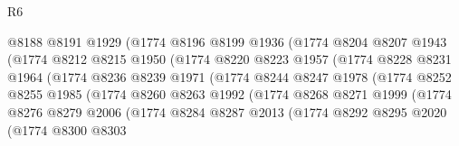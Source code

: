 \begin{lexlean}{R6}
\begin{coremodule}
                          @8188
                          @8191
                          @1929
                          (@1774
                            @8196
                            @8199
                            @1936
                            (@1774
                              @8204
                              @8207
                              @1943
                              (@1774
                                @8212
                                @8215
                                @1950
                                (@1774
                                  @8220
                                  @8223
                                  @1957
                                  (@1774
                                    @8228
                                    @8231
                                    @1964
                                    (@1774
                                      @8236
                                      @8239
                                      @1971
                                      (@1774
                                        @8244
                                        @8247
                                        @1978
                                        (@1774
                                          @8252
                                          @8255
                                          @1985
                                          (@1774
                                            @8260
                                            @8263
                                            @1992
                                            (@1774
                                              @8268
                                              @8271
                                              @1999
                                              (@1774
                                                @8276
                                                @8279
                                                @2006
                                                (@1774
                                                  @8284
                                                  @8287
                                                  @2013
                                                  (@1774
                                                    @8292
                                                    @8295
                                                    @2020
                                                    (@1774
                                                      @8300
                                                      @8303

\end{coremodule}
\end{lexlean}
